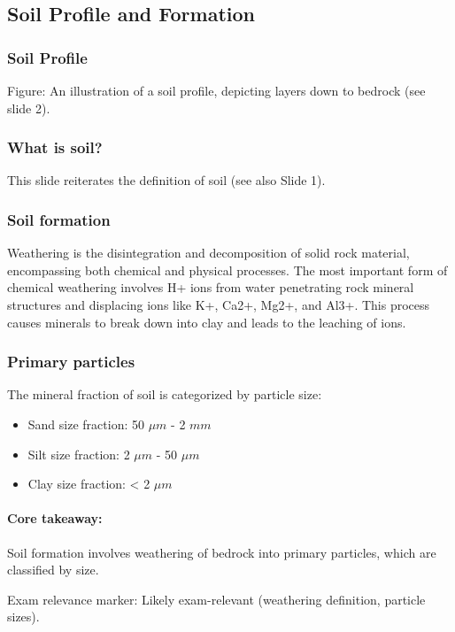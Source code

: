 \subsection{Soil Profile and Formation} 
\subsubsection{Soil Profile} Figure: An illustration of a soil profile, depicting layers down to bedrock (see slide 2).

\subsubsection{What is soil?} 
This slide reiterates the definition of soil (see also Slide 1).

\subsubsection{Soil formation} 
Weathering is the disintegration and decomposition of solid rock material, encompassing both chemical and physical processes. The most important form of chemical weathering involves H+ ions from water penetrating rock mineral structures and displacing ions like K+, Ca2+, Mg2+, and Al3+. This process causes minerals to break down into clay and leads to the leaching of ions.

\subsubsection{Primary particles} 
The mineral fraction of soil is categorized by particle size: 

\begin{itemize} 
    \item Sand size fraction: 50 $\mu m$ - 2 $mm$ 
    \item Silt size fraction: 2 $\mu m$ - 50 $\mu m$ 
    \item Clay size fraction: < 2 $\mu m$
\end{itemize}

\paragraph*{Core takeaway:} 
Soil formation involves weathering of bedrock into primary particles, which are classified by size. 

Exam relevance marker: Likely exam-relevant (weathering definition, particle sizes).

